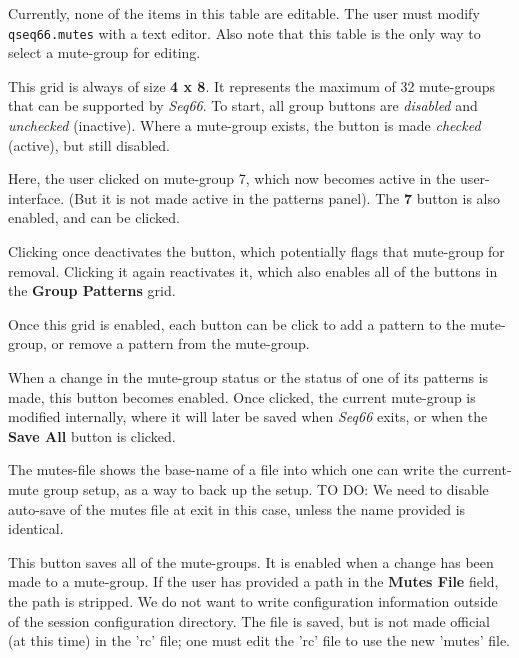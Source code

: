    Currently, none of the items in this table are editable.
   The user must modify \texttt{qseq66.mutes} with a text editor.
   Also note that this table is the only way to select a mute-group for editing.

   This grid is always of size \textbf{4 x 8}.  It represents the maximum of 32
   mute-groups that can be supported by \textsl{Seq66}.
   To start, all group buttons are \textsl{disabled} and
   \textsl{unchecked} (inactive).
   Where a mute-group exists, the button is made \textsl{checked} (active),
   but still disabled.

   Here, the user clicked on mute-group 7, which now becomes active in the
   user-interface.  (But it is not made active in the patterns panel).
   The \textbf{7} button is also enabled, and can be clicked.

   Clicking once deactivates the button, which potentially flags that mute-group
   for removal.  Clicking it again reactivates it, which also enables all of the
   buttons in the \textbf{Group Patterns} grid.

   Once this grid is enabled, each button can be click to add a pattern to the
   mute-group, or remove a pattern from the mute-group.

%
%
   When a change in the mute-group status or the status of one of its patterns
   is made, this button becomes enabled.  Once clicked, the current mute-group
   is modified internally, where it will later be saved when \textsl{Seq66}
   exits, or when the \textbf{Save All} button is clicked.

   The mutes-file shows the base-name of a file into which one can write the
   current-mute group setup, as a way to back up the setup.
   TO DO:  We need to disable auto-save of the mutes file at exit in this case,
   unless the name provided is identical.

%
%
   This button saves all of the mute-groups.
   It is enabled when a change has been made to a mute-group.
   If the user has provided a path in the \textbf{Mutes File} field, the path is
   stripped.  We do not want to write configuration information outside of the
   session configuration directory.
   The file is saved, but is not made official (at this time) in the
   'rc' file; one must edit the 'rc' file to use the new 'mutes' file.

